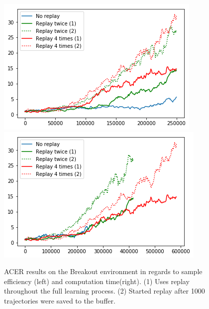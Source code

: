 \begin{figure}[h]
\includegraphics[scale=0.55]{bilder/breakoutreplayonline.png}
\includegraphics[scale=0.55]{bilder/breakoutreplaytime.png}
\caption{ACER results on the Breakout environment in regards to sample efficiency (left) and computation time(right). (1) Uses replay throughout the full learning process. (2) Started replay after 1000 trajectories were saved to the buffer.}
\end{figure}


